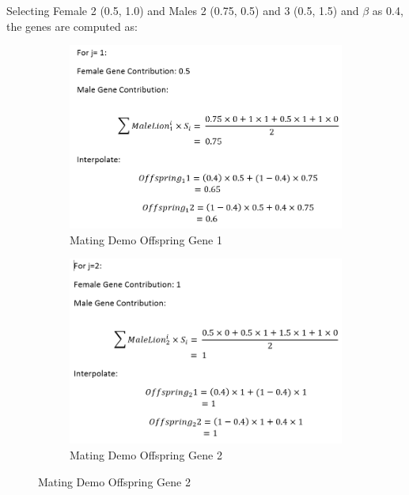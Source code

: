 Selecting Female 2 (0.5, 1.0) and Males 2 (0.75, 0.5) and 3 (0.5, 1.5) and $\beta$ as 0.4, the genes are computed as:

\begin{figure}[H]
  \centering
  \begin{subfigure}[b]{0.45\textwidth}
  \begin{center}
    \includegraphics[width=\textwidth]{img/mating/matingdemooff1}
    \caption{Mating Demo Offspring Gene 1}
  \end{center}
  \end{subfigure}
  \begin{subfigure}[b]{0.45\textwidth}
  \begin{center}
    \includegraphics[width=\textwidth]{img/mating/matingdemooff2}
    \caption{Mating Demo Offspring Gene 2}
  \end{center}
  \end{subfigure}
\end{figure}

